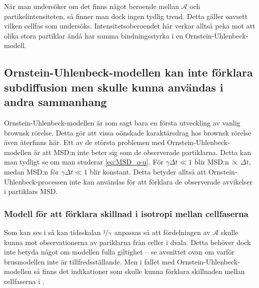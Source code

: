 När man undersöker om det finns något beroende mellan $\mathcal{A}$ och partikelintensiteten, så finner man dock ingen tydlig trend. Detta gäller oavsett vilken cellfas som undersöks.
Intensitetsoberoendet här verkar alltså peka mot att olika stora partiklar ändå har samma bindningsstyrka i en Ornstein-Uhlenbeck-modell. 







\subsection{Ornstein-Uhlenbeck-modellen kan inte förklara subdiffusion men skulle kunna användas i andra sammanhang}

Ornstein-Uhlenbeck-modellen är som sagt bara en första utveckling av vanlig brownsk rörelse. Detta gör att vissa oönskade karaktärsdrag hos brownsk rörelse även återfinns här. Ett av de största problemen med Ornstein-Uhlenbeck-modellen är att MSD:n inte beter sig som de observerade partiklarna. Detta kan man tydligt se om man studerar \eqref{eq:MSD_o-u}. För $\gamma\Delta{t}\ll 1$ blir $\text{MSD:n}\,\widetilde{\propto}\,\Delta{t}$, medan MSD:n för $\gamma\Delta{t}\ll 1$ blir konstant. 
Detta betyder alltså att Ornstein-Uhlenbeck-processen inte kan användas för att förklara de observerade avvikelser i partiklars MSD. %


\subsubsection{Modell för att förklara skillnad i isotropi mellan cellfaserna}

Som kan ses i  så kan tidsskalan $\nicefrac{1}{\gamma}$ anpassas så att fördelningen av $\mathcal{A}$ skulle kunna mot observationerna av pariklarna från celler i dvala. Detta behöver dock inte betyda något om modellen fulla giltighet -- se avsnittet ovan om varför brusmodellen inte är tillfredsställande. Men i fallet med Ornstein-Uhlenbeck-modellen så finns det indikationer som skulle kunna förklara skillnaden mellan cellfaserna i .

